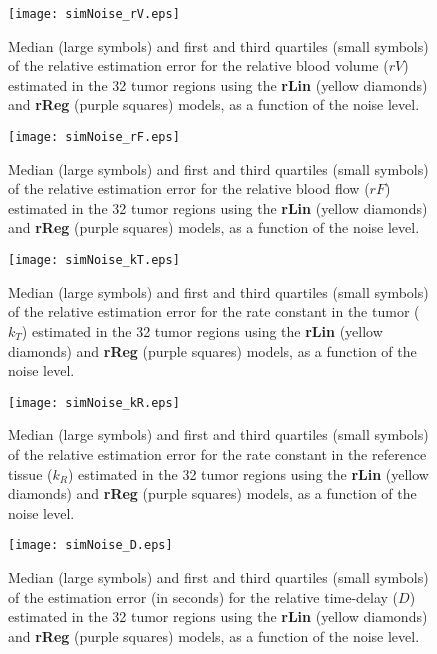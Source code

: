 \begin{subfigures}
    \begin{figure}\centering
        \texttt{[image: simNoise\_rV.eps]}
        \caption{Median (large symbols) and first and third quartiles (small symbols) of the relative estimation error for the relative blood volume ($rV$) estimated in the 32 tumor regions using the \textbf{rLin} (yellow diamonds) and \textbf{rReg} (purple squares) models, as a function of the noise level.}
        \label{fig:noise_rV}
    \end{figure}
    \begin{figure}\centering
        \texttt{[image: simNoise\_rF.eps]}
        \caption{Median (large symbols) and first and third quartiles (small symbols) of the relative estimation error for the relative blood flow ($rF$) estimated in the 32 tumor regions using the \textbf{rLin} (yellow diamonds) and \textbf{rReg} (purple squares) models, as a function of the noise level.}
        \label{fig:noise_rF}
    \end{figure}
    \begin{figure}\centering
        \texttt{[image: simNoise\_kT.eps]}
        \caption{Median (large symbols) and first and third quartiles (small symbols) of the relative estimation error for the rate constant in the tumor ($k_T$) estimated in the 32 tumor regions using the \textbf{rLin} (yellow diamonds) and \textbf{rReg} (purple squares) models, as a function of the noise level.}
        \label{fig:noise_kT}
    \end{figure}
    \begin{figure}\centering
        \texttt{[image: simNoise\_kR.eps]}
        \caption{Median (large symbols) and first and third quartiles (small symbols) of the relative estimation error for the rate constant in the reference tissue ($k_R$) estimated in the 32 tumor regions using the \textbf{rLin} (yellow diamonds) and \textbf{rReg} (purple squares) models, as a function of the noise level.}
        \label{fig:noise_kR}
    \end{figure}
    \begin{figure}\centering
        \texttt{[image: simNoise\_D.eps]}
        \caption{Median (large symbols) and first and third quartiles (small symbols) of the estimation error (in seconds) for the relative time-delay ($D$) estimated in the 32 tumor regions using the \textbf{rLin} (yellow diamonds) and \textbf{rReg} (purple squares) models, as a function of the noise level.}
        \label{fig:noise_D}
    \end{figure}
\end{subfigures}
\FloatBarrier

